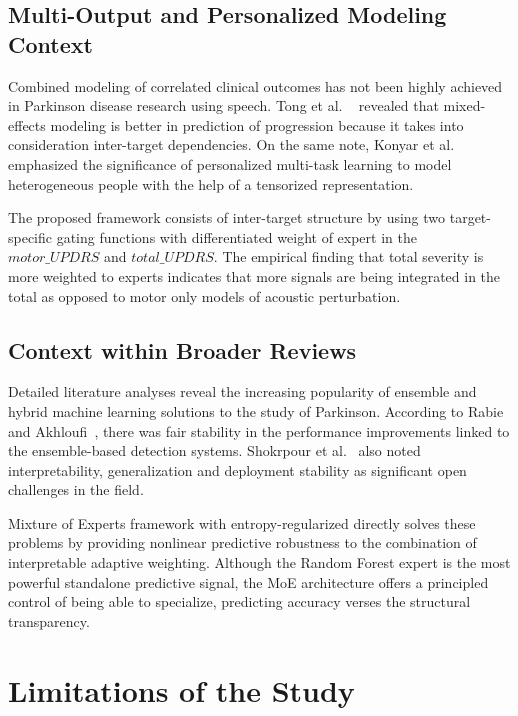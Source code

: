 \documentclass{customIEEEsingle}
\begin{document}
	
	\subsection{Multi-Output and Personalized Modeling Context}
	
	Combined modeling of correlated clinical outcomes has not been highly achieved in Parkinson disease research using speech. Tong et al. ~\cite{tong-2025} revealed that mixed-effects modeling is better in prediction of progression because it takes into consideration inter-target dependencies. On the same note, Konyar et al.~\cite{konyar-2025} emphasized the significance of personalized multi-task learning to model heterogeneous people with the help of a tensorized representation.
	
	The proposed framework consists of inter-target structure by using two target-specific gating functions with differentiated weight of expert in the $motor\_UPDRS$ and $total\_UPDRS$. The empirical finding that total severity is more weighted to experts indicates that more signals are being integrated in the total as opposed to motor only models of acoustic perturbation.
	
	\subsection{Context within Broader Reviews}
	
	Detailed literature analyses reveal the increasing popularity of ensemble and hybrid machine learning solutions to the study of Parkinson. According to Rabie and Akhloufi~\cite{rabie-2025}, there was fair stability in the performance improvements linked to the ensemble-based detection systems. Shokrpour et al.~\cite{shokrpour-2025} also noted interpretability, generalization and deployment stability as significant open challenges in the field.
	
	Mixture of Experts framework with entropy-regularized directly solves these problems by providing nonlinear predictive robustness to the combination of interpretable adaptive weighting. Although the Random Forest expert is the most powerful standalone predictive signal, the MoE architecture offers a principled control of being able to specialize, predicting accuracy verses the structural transparency.
	
	\section{Limitations of the Study}
	\label{sec:limitations}
	
\end{document}
